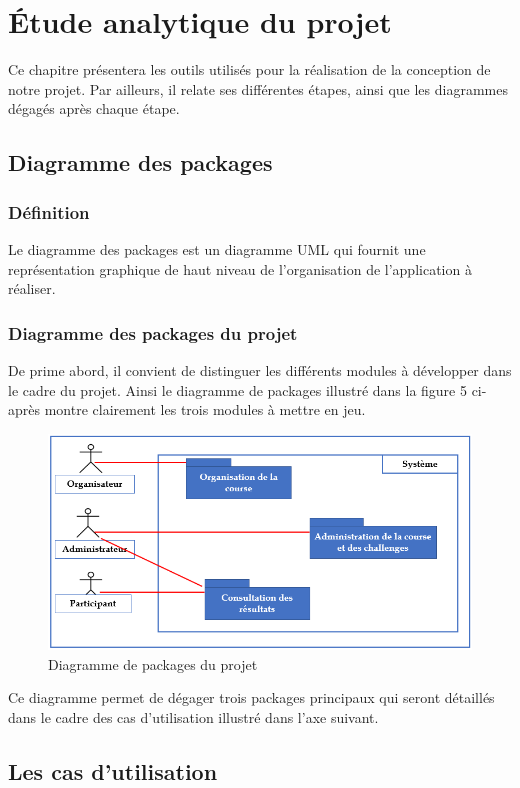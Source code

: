 \section {Étude analytique du projet}

Ce chapitre présentera les outils utilisés pour la réalisation de la conception de notre projet. Par ailleurs, il relate ses différentes étapes, ainsi que les diagrammes dégagés après chaque étape.

\subsection {Diagramme des packages}
\subsubsection{Définition}
Le diagramme des packages est un diagramme UML qui fournit une représentation graphique de haut niveau de l'organisation de l’application à réaliser.
\subsubsection{Diagramme des packages du projet}
De prime abord, il convient de distinguer les différents modules à développer dans le cadre du projet. Ainsi le diagramme de packages illustré dans la figure 5 ci-après montre clairement les trois modules à mettre en jeu.
\begin{figure}[!h]
	   \center
	   \includegraphics[scale=0.9]{img/Diagramme_de_packages.png}
	   \caption {Diagramme de packages du projet}
\end{figure}

Ce diagramme permet de dégager trois packages principaux qui seront détaillés dans le cadre des cas d’utilisation illustré dans l’axe suivant.

\subsection {Les cas d’utilisation}

